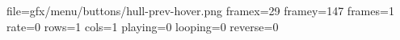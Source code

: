 file=gfx/menu/buttons/hull-prev-hover.png
framex=29
framey=147
frames=1
rate=0
rows=1
cols=1
playing=0
looping=0
reverse=0